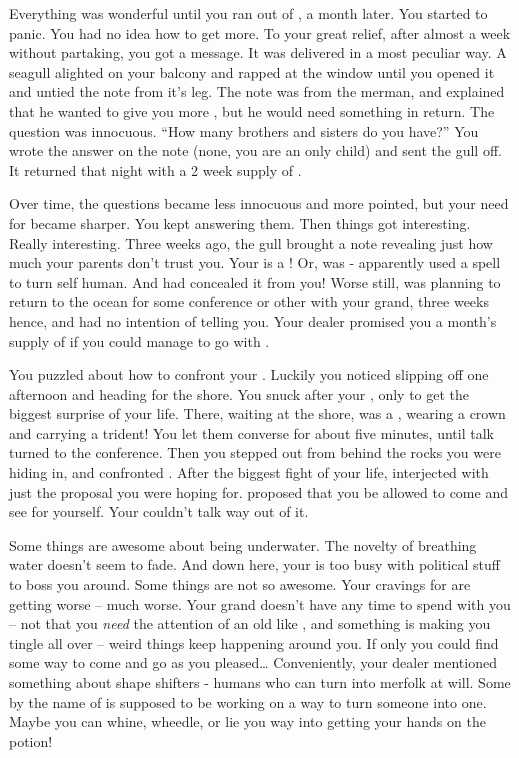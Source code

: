 \documentclass[char]{NeptuneBall}
\begin{document}
Everything was wonderful until you ran out of \iDrug{\MYname}, a month later. You started to panic. You had no idea how to get more. To your great relief, after almost a week without partaking, you got a message. It was delivered in a most peculiar way. A seagull alighted on your balcony and rapped at the window until you opened it and untied the note from it's leg. The note was from the merman, and explained that he wanted to give you more \iDrug{\MYname}, but he would need something in return.  The question was innocuous. ``How many brothers and sisters do you have?'' You wrote the answer on the note (none, you are an only child) and sent the gull off. It returned that night with a 2 week supply of \iDrug{\MYname}.

Over time, the questions became less innocuous and more pointed, but your need for \iDrug{\MYname} became sharper. You kept answering them. Then things got interesting. Really interesting. Three weeks ago, the gull brought a note revealing just how much your parents don't trust you. Your \cAriel{\parent} \cAriel{} is a \cAriel{\mer}! Or, was - apparently \cAriel{\they} used a spell to turn \cAriel{\their}self human. And \cAriel{\they} had concealed it from you! Worse still, \cAriel{} was planning to return to the ocean for some conference or other with your grand\cKing{\parent}, three weeks hence, and had no intention of telling you. Your dealer promised you a month's supply of \iDrug{\MYname} if you could manage to go with \cAriel{\them}.

You puzzled about how to confront your \cAriel{\parent}. Luckily you noticed \cAriel{\them} slipping off one afternoon and heading for the shore. You snuck after your \cAriel{\parent}, only to get the biggest surprise of your life. There, waiting at the shore, was a , wearing a crown and carrying a trident! You let them converse for about five minutes, until talk turned to the conference. Then you stepped out from behind the rocks you were hiding in, and confronted \cAriel{}. After the biggest fight of your life, \cKing{} interjected with just the proposal you were hoping for. \cKing{\They} proposed that you be allowed to come and see \pAtlantis{} for yourself. Your \cAriel{\parent} couldn't talk \cAriel{\their} way out of it.

Some things are awesome about being underwater. The novelty of breathing water doesn't seem to fade. And down here, your \cAriel{\parent} is too busy with political stuff to boss you around. Some things are not so awesome. Your cravings for \iDrug{\MYname} are getting worse -- much worse. Your grand\cKing{\parent} doesn't have any time to spend with you -- not that you \emph{need} the attention of an old \cKing{\mer} like \cKing{\them}, and something is making you tingle all over -- weird things keep happening around you. If only you could find some way to come and go as you pleased\ldots{} Conveniently, your dealer mentioned something about shape shifters - humans who can turn into merfolk at will. Some \cManta{\mer} by the name of \cManta{} is supposed to be working on a way to turn someone into one. Maybe you can whine, wheedle, or lie you way into getting your hands on the potion!
\end{document}
